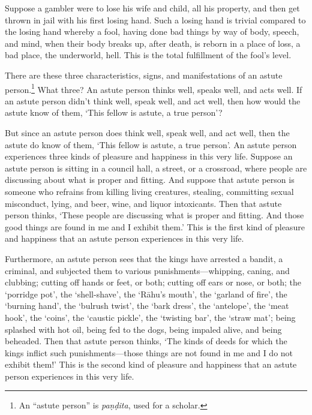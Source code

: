 \documentclass[12pt,openany]{book}%
\begin{document}
Suppose a gambler were to lose his wife and child, all his property, and then get thrown in jail with his first losing hand. Such a losing hand is trivial compared to the losing hand whereby a fool, having done bad things by way of body, speech, and mind, when their body breaks up, after death, is reborn in a place of loss, a bad place, the underworld, hell. This is the total fulfillment of the fool’s level. 

There are these three characteristics, signs, and manifestations of an astute person.\footnote{An “astute person” is \textit{\textsanskrit{paṇḍita}}, used for a scholar. } What three? An astute person thinks well, speaks well, and acts well. If an astute person didn’t think well, speak well, and act well, then how would the astute know of them, ‘This fellow is astute, a true person’? 

But since an astute person does think well, speak well, and act well, then the astute do know of them, ‘This fellow is astute, a true person’. An astute person experiences three kinds of pleasure and happiness in this very life. Suppose an astute person is sitting in a council hall, a street, or a crossroad, where people are discussing about what is proper and fitting. And suppose that astute person is someone who refrains from killing living creatures, stealing, committing sexual misconduct, lying, and beer, wine, and liquor intoxicants. Then that astute person thinks, ‘These people are discussing what is proper and fitting. And those good things are found in me and I exhibit them.’ This is the first kind of pleasure and happiness that an astute person experiences in this very life. 

Furthermore, an astute person sees that the kings have arrested a bandit, a criminal, and subjected them to various punishments—whipping, caning, and clubbing; cutting off hands or feet, or both; cutting off ears or nose, or both; the ‘porridge pot’, the ‘shell-shave’, the ‘\textsanskrit{Rāhu}’s mouth’, the ‘garland of fire’, the ‘burning hand’, the ‘bulrush twist’, the ‘bark dress’, the ‘antelope’, the ‘meat hook’, the ‘coins’, the ‘caustic pickle’, the ‘twisting bar’, the ‘straw mat’; being splashed with hot oil, being fed to the dogs, being impaled alive, and being beheaded. Then that astute person thinks, ‘The kinds of deeds for which the kings inflict such punishments—those things are not found in me and I do not exhibit them!’ This is the second kind of pleasure and happiness that an astute person experiences in this very life. 
\end{document}
